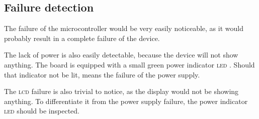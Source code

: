 \documentclass[10pt]{article}
\begin{document}
\subsection{Failure detection}

The failure of the microcontroller would be very easily noticeable, as it would probably result in a complete failure of the device.
    
The lack of power is also easily detectable, because the device will not show anything.
The board is equipped with a small green power indicator \textsc{led} \cite{eduboard-man}. 
Should that indicator not be lit, means the failure of the power supply.

The \textsc{lcd} failure is also trivial to notice, as the display would not be showing anything.
To differentiate it from the power supply failure, the power indicator \textsc{led} should be inspected.

\nocite{*}


\end{document}
